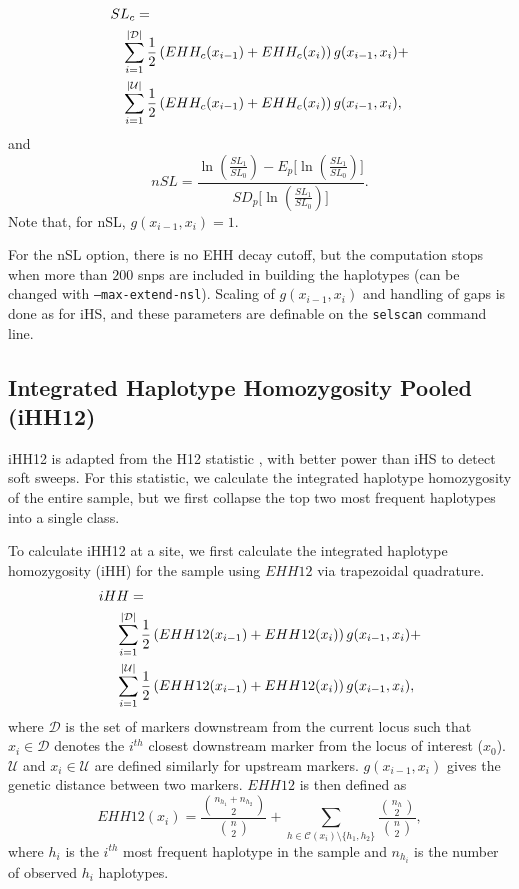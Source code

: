 \documentclass[12pt]{article}%
\newcommand{\negspace}{\!\!\!\!\!\!\!\!\!\!\!\!}
\begin{document}
\begin{align}\label{eq:sl}
SL_c =& \notag\\
&\negspace\sum_{i = 1}^{|\mathcal{D}|} \frac{1}{2}\left(EHH_c(x_{i-1}) + EHH_c(x_i)\right)g(x_{i-1},x_i) + \notag\\
&\negspace\sum_{i = 1}^{|\mathcal{U}|} \frac{1}{2}\left(EHH_c(x_{i-1}) + EHH_c(x_i)\right)g(x_{i-1},x_i),
\end{align}
and
\begin{equation}
nSL = \frac{\ln\left(\frac{SL_1}{SL_0}\right) - E_p\Big[\ln\left(\frac{SL_1}{SL_0}\right)\Big]}{SD_p\Big[\ln\left(\frac{SL_1}{SL_0}\right)\Big]}.
\end{equation}
Note that, for nSL, $g(x_{i-1},x_i) = 1$.

For the nSL option, there is no EHH decay cutoff, but the computation stops when more than $200$ snps are included in building the haplotypes (can be changed with {\tt --max-extend-nsl}).  Scaling of $g(x_{i-1},x_i)$ and handling of gaps is done as for iHS, and these parameters are definable 
on the {\tt selscan} command line.

\subsection{Integrated Haplotype Homozygosity Pooled (iHH12)}\label{sec:ihh12}

iHH12 is adapted from the H12 statistic \cite[]{GarudEtAl15}, with better power than iHS to detect soft sweeps. For this statistic, we calculate the integrated haplotype homozygosity of the entire sample, but we first collapse the top two most frequent haplotypes into a single class.

To calculate iHH12 at a site, we first calculate the integrated haplotype 
homozygosity (iHH) for the sample using $EHH12$ via trapezoidal quadrature.
\begin{align}\label{eq:ihh12}
iHH =& \notag\\
&\negspace\sum_{i = 1}^{|\mathcal{D}|} \frac{1}{2}\left(EHH12(x_{i-1}) + EHH12(x_i)\right)g(x_{i-1},x_i) + \notag\\
&\negspace\sum_{i = 1}^{|\mathcal{U}|} \frac{1}{2}\left(EHH12(x_{i-1}) + EHH12(x_i)\right)g(x_{i-1},x_i),
\end{align}
where $\mathcal{D}$ is the set of markers downstream from the current locus 
such that $x_i \in \mathcal{D}$ denotes the $i^{th}$ closest downstream 
marker from the locus of interest ($x_0$). $\mathcal{U}$ and $x_i \in \mathcal{U}$ are defined similarly 
for upstream markers. $g(x_{i-1},x_i)$ gives the genetic distance between two 
markers.  $EHH12$ is then defined as
\begin{equation}\label{eq:ehh12}
EHH12(x_i) = \frac{{n_{h_1} + n_{h_2} \choose 2}}{{n \choose 2}} + \sum_{h \in \mathcal{C}(x_i)\setminus \{h_1, h_2\}} \frac{{n_h \choose 2}}{{n \choose 2}},
\end{equation}
where $h_i$ is the $i^{th}$ most frequent haplotype in the sample and $n_{h_i}$ is the number of observed $h_i$ haplotypes.
\end{document}
